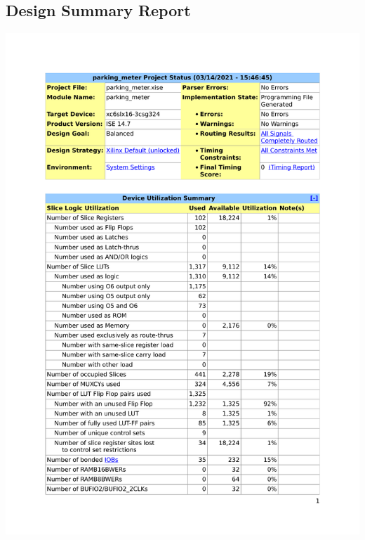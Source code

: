 \documentclass{article}
\begin{document}
\subsection{Design Summary Report}

{\centering\includegraphics[scale=0.8, page=1]{../figs/summary.pdf}\par}
\end{document}
